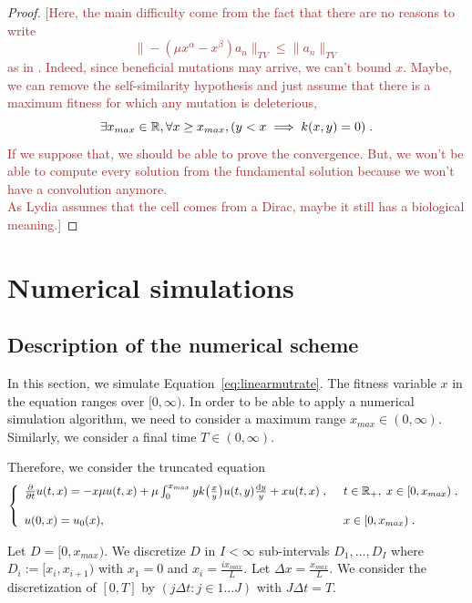 \documentclass[11pt]{amsart}
\newcommand{\ndr}[1]{\textcolor{brown}{[#1]}}
\begin{document}
\begin{proof}
\ndr{Here, the main difficulty come from the fact that there are no reasons to write 
$$ \| -(\mu x^\alpha - x^\beta) a_n\|_{TV} \leq \| a_n \|_{TV}$$
as in \cite[p.16]{doumic2021inverse}. Indeed, since beneficial mutations may arrive, we can't bound $x$. Maybe, we can remove the self-similarity hypothesis and just assume that there is a maximum fitness for which any mutation is deleterious, \ie 
$$ \exists x_{max} \in \mathbb{R}, \forall x \geq x_{max}, (y < x \implies k(x,y) = 0) \; .$$
If we suppose that, we should be able to prove the convergence. But, we won't be able to compute every solution from the fundamental solution because we won't have a convolution anymore. \\
As Lydia assumes that the cell comes from a Dirac, maybe it still has a biological meaning.}
\end{proof}


\appendix

\section{Numerical simulations}

\subsection{Description of the numerical scheme}
\label{s:num_schme}

In this section, we simulate Equation~\eqref{eq:linearmutrate}. The fitness variable $x$ in the equation ranges over $[0,\infty)$. In order to be able to apply a numerical simulation algorithm, we need to consider a maximum range $x_{max} \in (0,\infty)$. Similarly, we consider a final time $T \in (0,\infty)$.

Therefore, we consider the truncated equation
\begin{equation}\left\{
    \begin{array}{ll}
	\frac{\partial}{\partial t}u(t,x) = - x\mu u(t,x) + \mu \int_{0}^{x_{max}} y k\big( \frac{x}{y}\big) u(t,y) \frac{\mathrm dy}{y} + xu(t,x)
	\; , \enspace
	& t \in \mathbb{R}_+, \; x \in [0,x_{max}) \; ,
	\\ \\
	u(0, x) = u_0(x),
	& x \in [0,x_{max})
	\; .
    \end{array}
	\right.
    \label{eq:linearmutratetrunc}
\end{equation}

Let $D = [0, x_{max})$. We discretize $D$ in $I < \infty$ sub-intervals
$D_1, \ldots, D_I$ where $D_i := [x_i, x_{i+1})$ with $x_1 = 0$ and $x_i = \frac{i x_{max}}{L}$. Let $\Delta x = \frac{x_{max}}{L}$. We consider the discretization of $[0,T]$ by $(j\Delta t : j \in 1\ldots J )$ with $J \Delta t = T$.\\ 
\end{document}

